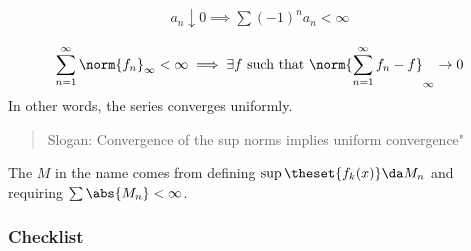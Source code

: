 \begin{theorem}

\begin{align*}
a_n \downarrow 0 \implies \sum (-1)^n a_n < \infty
\end{align*}

\end{theorem}

\begin{theorem}

\begin{align*}
\sum_{n=1}^\infty \norm{f_n}_\infty < \infty 
\implies \exists f\text{ such that } \norm{ \sum_{n=1}^\infty f_n - f}_\infty \to 0
\end{align*} In other words, the series converges uniformly.

\begin{quote}
Slogan: Convergence of the sup norms implies uniform convergence"
\end{quote}

\end{theorem}

\begin{remark}

The \(M\) in the name comes from defining
\(\sup\theset{f_k(x)} \da M_n\) and requiring
\(\sum \abs{M_n} < \infty\).

\end{remark}

\hypertarget{checklist-1}{%
\subsubsection{Checklist}\label{checklist-1}}

